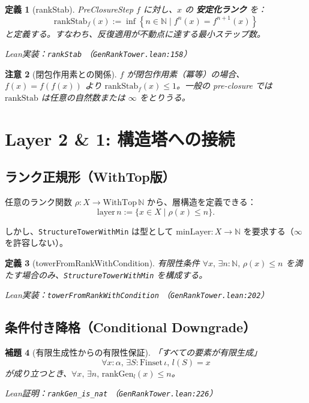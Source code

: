 \documentclass[a4paper,12pt]{ltjsarticle}
\newtheorem{definition}{定義}[section]
\newtheorem{lemma}[definition]{補題}
\newtheorem{remark}[definition]{注意}
\newcommand{\N}{\mathbb{N}}
\newcommand{\Lean}[1]{\texttt{\color{blue}#1}}
\begin{document}
\begin{definition}[rankStab]
PreClosureStep $f$ に対し、$x$ の \textbf{安定化ランク} を：
\[
  \mathrm{rankStab}_f(x) := \inf \left\{ n \in \N \mid f^n(x) = f^{n+1}(x) \right\}
\]
と定義する。すなわち、反復適用が不動点に達する最小ステップ数。

Lean実装：\Lean{rankStab} （\texttt{GenRankTower.lean:158}）
\end{definition}

\begin{remark}[閉包作用素との関係]
$f$ が閉包作用素（冪等）の場合、$f(x) = f(f(x))$ より $\mathrm{rankStab}_f(x) \le 1$。一般の pre-closure では $\mathrm{rankStab}$ は任意の自然数または $\infty$ をとりうる。
\end{remark}

\section{Layer 2 \& 1: 構造塔への接続}

\subsection{ランク正規形（WithTop版）}

任意のランク関数 $\rho : X \to \mathrm{WithTop}\, \N$ から、層構造を定義できる：
\[
  \text{layer}\, n := \{ x \in X \mid \rho(x) \le n \}.
\]

しかし、\texttt{StructureTowerWithMin} は型として $\mathrm{minLayer} : X \to \N$ を要求する（$\infty$ を許容しない）。

\begin{definition}[towerFromRankWithCondition]
有限性条件 $\forall x,\, \exists n : \N,\, \rho(x) \le n$ を満たす場合のみ、\texttt{StructureTowerWithMin} を構成する。

Lean実装：\Lean{towerFromRankWithCondition} （\texttt{GenRankTower.lean:202}）
\end{definition}

\subsection{条件付き降格（Conditional Downgrade）}

\begin{lemma}[有限生成性からの有限性保証]
「すべての要素が有限生成」
\[
  \forall x : \alpha,\, \exists S : \mathrm{Finset}\, \iota,\, l(S) = x
\]
が成り立つとき、$\forall x,\, \exists n,\, \mathrm{rankGen}_l(x) \le n$。

Lean証明：\Lean{rankGen\_is\_nat} （\texttt{GenRankTower.lean:226}）
\end{lemma}
\end{document}
